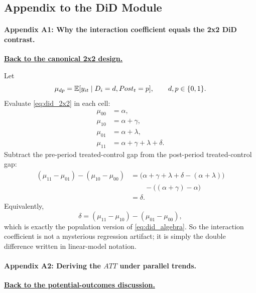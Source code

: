 \subsection*{Appendix to the DiD Module}
\hypertarget{app:did-reg}{}
\paragraph{Appendix A1: Why the interaction coefficient equals the 2x2 \ac{DiD} contrast.}
\hyperlink{main:did-2x2}{\textbf{Back to the canonical 2x2 design.}}

Let
\[
\mu_{dp} = \mathbb{E}[y_{it}\mid D_i=d,Post_t=p], \qquad d,p \in \{0,1\}.
\]
Evaluate \eqref{eq:did_2x2} in each cell:
\begin{align*}
\mu_{00} &= \alpha, \\
\mu_{10} &= \alpha + \gamma, \\
\mu_{01} &= \alpha + \lambda, \\
\mu_{11} &= \alpha + \gamma + \lambda + \delta.
\end{align*}
Subtract the pre-period treated-control gap from the post-period treated-control gap:
\begin{align*}
(\mu_{11}-\mu_{01})-(\mu_{10}-\mu_{00})
&=
\big(\alpha+\gamma+\lambda+\delta-(\alpha+\lambda)\big) \\
&\qquad - \big((\alpha+\gamma)-\alpha\big) \\
&= \delta.
\end{align*}
Equivalently,
\[
\delta = (\mu_{11}-\mu_{10})-(\mu_{01}-\mu_{00}),
\]
which is exactly the population version of \eqref{eq:did_algebra}. So the interaction coefficient is not a mysterious regression artifact; it is simply the double difference written in linear-model notation.

\hypertarget{app:did-att}{}
\paragraph{Appendix A2: Deriving the $ATT$ under parallel trends.}
\hyperlink{main:did-po}{\textbf{Back to the potential-outcomes discussion.}}

